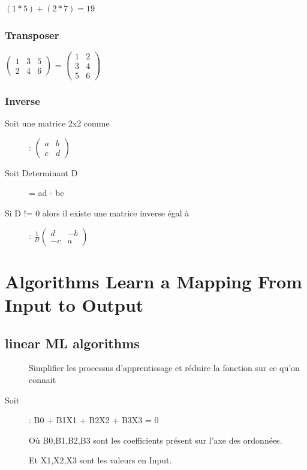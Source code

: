 $(1 * 5) + (2 * 7) = 19$

\subsection{Transposer}

$\left(\begin{array}{ccc}
1 & 3 & 5 \\ 2 & 4 & 6 \end{array} \right) $
= 
$\left(\begin{array}{cc}
1 & 2 \\ 3 & 4 \\ 5 & 6 \end{array} \right) $

\subsection{Inverse}
\begin{description}
\item[Soit une matrice 2x2 comme]:
$\left(\begin{array}{ccc}
a & b \\ c & d \end{array} \right) $
\item[Soit Determinant D] = ad - bc
\item[Si D != 0 alors il existe une matrice inverse égal à]:
$ \frac{1}{D} \left(\begin{array}{ccc}
d & -b \\ -c & a \end{array} \right) $
\end{description}

\chapter{Algorithms Learn a Mapping From Input to Output}
\section{linear ML algorithms}

\begin{description}
\item[] Simplifier les processus d'apprentissage et réduire la fonction sur ce qu'on connait
\item[Soit ]: B0 + B1X1 + B2X2 + B3X3 = 0
\item[] Où B0,B1,B2,B3 sont les coefficients présent sur l'axe des ordonnées.
\item[] Et X1,X2,X3 sont les valeurs en Input.
\end{description}

